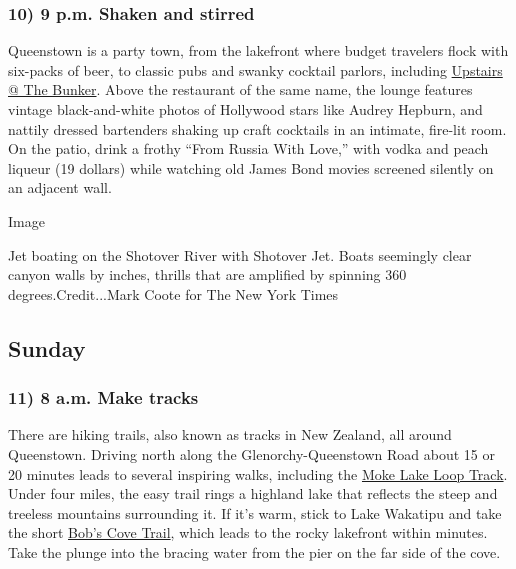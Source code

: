 \hypertarget{10-9-pm-shaken-and-stirred}{%
\subsubsection{\texorpdfstring{\textbf{10) 9 p.m. Shaken and
stirred}}{10) 9 p.m. Shaken and stirred}}\label{10-9-pm-shaken-and-stirred}}

Queenstown is a party town, from the lakefront where budget travelers
flock with six-packs of beer, to classic pubs and swanky cocktail
parlors, including \href{https://www.thebunker.co.nz/}{Upstairs @ The
Bunker}. Above the restaurant of the same name, the lounge features
vintage black-and-white photos of Hollywood stars like Audrey Hepburn,
and nattily dressed bartenders shaking up craft cocktails in an
intimate, fire-lit room. On the patio, drink a frothy ``From Russia With
Love,'' with vodka and peach liqueur (19 dollars) while watching old
James Bond movies screened silently on an adjacent wall.

Image

Jet boating on the Shotover River with Shotover Jet. Boats seemingly
clear canyon walls by inches, thrills that are amplified by spinning 360
degrees.Credit...Mark Coote for The New York Times

\hypertarget{sunday}{%
\subsection{Sunday}\label{sunday}}

\hypertarget{11-8-am-make-tracks}{%
\subsubsection{\texorpdfstring{\textbf{11) 8 a.m. Make
tracks}}{11) 8 a.m. Make tracks}}\label{11-8-am-make-tracks}}

There are hiking trails, also known as tracks in New Zealand, all around
Queenstown. Driving north along the Glenorchy-Queenstown Road about 15
or 20 minutes leads to several inspiring walks, including the
\href{https://www.doc.govt.nz/parks-and-recreation/places-to-go/otago/places/queenstown-area/things-to-do/moke-lake-loop-track/?region=otago\&park=346498f5-d802-46e4-b38c-92dca1c96f0a\&activity=walking-trampin}{Moke
Lake Loop Track}. Under four miles, the easy trail rings a highland lake
that reflects the steep and treeless mountains surrounding it. If it's
warm, stick to Lake Wakatipu and take the short
\href{https://www.doc.govt.nz/parks-and-recreation/places-to-go/otago/places/queenstown-area/things-to-do/bobs-cove-track-and-nature-walk/}{Bob's
Cove Trail}, which leads to the rocky lakefront within minutes. Take the
plunge into the bracing water from the pier on the far side of the cove.

